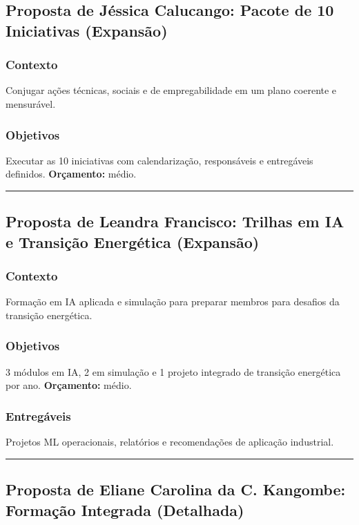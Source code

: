 \documentclass[12pt,a4paper]{article}
\newcommand{\proposalsep}{%
  \vspace{6pt}%
  {\color{gold}\rule{0.35\linewidth}{0.7pt}}%
  \vspace{4pt}%
}
\begin{document}
\subsection{Proposta de Jéssica Calucango: Pacote de 10 Iniciativas (Expansão)}

\subsubsection*{Contexto}
Conjugar ações técnicas, sociais e de empregabilidade em um plano coerente e mensurável.

\subsubsection*{Objetivos}
Executar as 10 iniciativas com calendarização, responsáveis e entregáveis definidos. \textbf{Orçamento:} médio.

\proposalsep

\subsection{Proposta de Leandra Francisco: Trilhas em IA e Transição Energética (Expansão)}

\subsubsection*{Contexto}
Formação em IA aplicada e simulação para preparar membros para desafios da transição energética.

\subsubsection*{Objetivos}
3 módulos em IA, 2 em simulação e 1 projeto integrado de transição energética por ano. \textbf{Orçamento:} médio.

\subsubsection*{Entregáveis}
Projetos ML operacionais, relatórios e recomendações de aplicação industrial.

\proposalsep

\subsection{Proposta de Eliane Carolina da C. Kangombe: Formação Integrada (Detalhada)}
\end{document}
